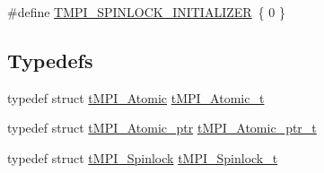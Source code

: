 \begin{DoxyCompactItemize}
\item 
\#define \hyperlink{include_2thread__mpi_2atomic_2suncc-sparc_8h_a1e5bbd6483e8792893f3a5e8e2bbe510}{\-T\-M\-P\-I\-\_\-\-S\-P\-I\-N\-L\-O\-C\-K\-\_\-\-I\-N\-I\-T\-I\-A\-L\-I\-Z\-E\-R}~\{ 0 \}
\end{DoxyCompactItemize}
\subsection*{\-Typedefs}
\begin{DoxyCompactItemize}
\item 
typedef struct \hyperlink{structtMPI__Atomic}{t\-M\-P\-I\-\_\-\-Atomic} \hyperlink{include_2thread__mpi_2atomic_2suncc-sparc_8h_a2c33794dc540e3b07cffc1f81a3fe4b4}{t\-M\-P\-I\-\_\-\-Atomic\-\_\-t}
\item 
typedef struct \hyperlink{structtMPI__Atomic__ptr}{t\-M\-P\-I\-\_\-\-Atomic\-\_\-ptr} \hyperlink{include_2thread__mpi_2atomic_2suncc-sparc_8h_a4c91c0105f1c0a5f23bc4239274291eb}{t\-M\-P\-I\-\_\-\-Atomic\-\_\-ptr\-\_\-t}
\item 
typedef struct \hyperlink{structtMPI__Spinlock}{t\-M\-P\-I\-\_\-\-Spinlock} \hyperlink{include_2thread__mpi_2atomic_2suncc-sparc_8h_a633ceb65ba18cbc39b03d5f44bf66875}{t\-M\-P\-I\-\_\-\-Spinlock\-\_\-t}
\end{DoxyCompactItemize}
